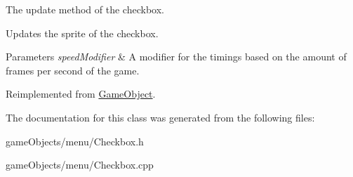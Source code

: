 The update method of the checkbox. 

Updates the sprite of the checkbox. 
\begin{DoxyParams}{Parameters}
{\em speed\+Modifier} & A modifier for the timings based on the amount of frames per second of the game. \\
\hline
\end{DoxyParams}


Reimplemented from \hyperlink{class_game_object_acf6423054877d1344b6e0b1f4e740df5}{Game\+Object}.



The documentation for this class was generated from the following files\+:\begin{DoxyCompactItemize}
\item 
game\+Objects/menu/Checkbox.\+h\item 
game\+Objects/menu/Checkbox.\+cpp\end{DoxyCompactItemize}
